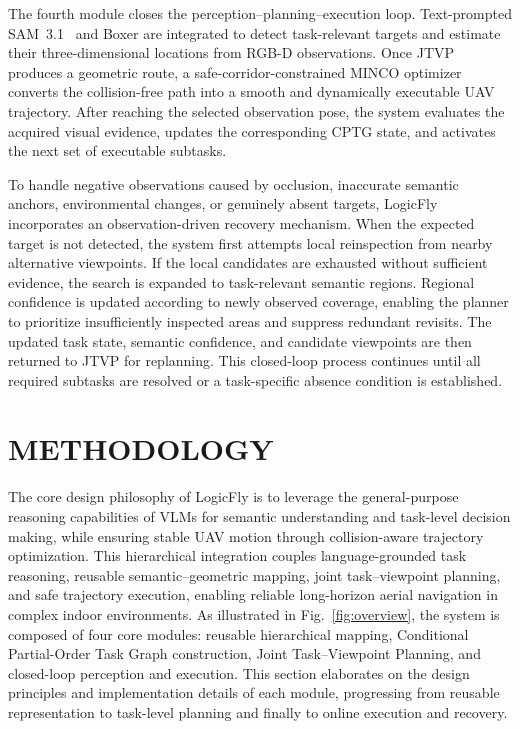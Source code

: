 \documentclass[letterpaper,10pt,journal]{IEEEtran}
\begin{document}
The fourth module closes the perception--planning--execution loop. Text-prompted SAM~3.1~\cite{carion2025sam3} and Boxer are integrated to detect task-relevant targets and estimate their three-dimensional locations from RGB-D observations. Once JTVP produces a geometric route, a safe-corridor-constrained MINCO optimizer converts the collision-free path into a smooth and dynamically executable UAV trajectory. After reaching the selected observation pose, the system evaluates the acquired visual evidence, updates the corresponding CPTG state, and activates the next set of executable subtasks.

To handle negative observations caused by occlusion, inaccurate semantic anchors, environmental changes, or genuinely absent targets, LogicFly incorporates an observation-driven recovery mechanism. When the expected target is not detected, the system first attempts local reinspection from nearby alternative viewpoints. If the local candidates are exhausted without sufficient evidence, the search is expanded to task-relevant semantic regions. Regional confidence is updated according to newly observed coverage, enabling the planner to prioritize insufficiently inspected areas and suppress redundant revisits. The updated task state, semantic confidence, and candidate viewpoints are then returned to JTVP for replanning. This closed-loop process continues until all required subtasks are resolved or a task-specific absence condition is established.

\section{METHODOLOGY}
\label{sec:methodology}

The core design philosophy of LogicFly is to leverage the general-purpose reasoning capabilities of VLMs for semantic understanding and task-level decision making, while ensuring stable UAV motion through collision-aware trajectory optimization. This hierarchical integration couples language-grounded task reasoning, reusable semantic--geometric mapping, joint task--viewpoint planning, and safe trajectory execution, enabling reliable long-horizon aerial navigation in complex indoor environments. As illustrated in Fig.~\ref{fig:overview}, the system is composed of four core modules: reusable hierarchical mapping, Conditional Partial-Order Task Graph construction, Joint Task--Viewpoint Planning, and closed-loop perception and execution. This section elaborates on the design principles and implementation details of each module, progressing from reusable representation to task-level planning and finally to online execution and recovery.
\end{document}
